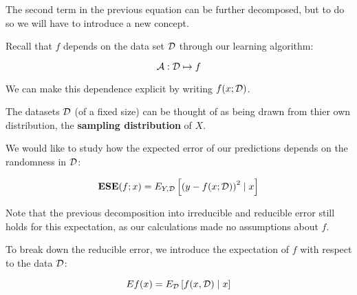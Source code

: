 %
%
\begin{frame}
  The second term in the previous equation can be further decomposed, but to do
  so we will have to introduce a new concept.  
\end{frame}
%
%
\begin{frame}
  Recall that $f$ depends on the data set $\operatorname*{\mathcal{D}}$ through our learning algorithm:

  $$ \operatorname*{\mathcal{A}} : \operatorname*{\mathcal{D}} \mapsto f $$

  We can make this dependence explicit by writing $f(x; \operatorname*{\mathcal{D}})$.
\end{frame}
%
%
\begin{frame}
  The datasets $\operatorname*{\mathcal{D}}$ (of a fixed size) can be thought of as being drawn from
  thier own distribution, the \textbf{sampling distribution} of $X$.   
\end{frame}
%
%
\begin{frame}
  We would like to study how the expected error of our predictions depends on
  the randomness in $\operatorname*{\mathcal{D}}$:

  $$ \operatorname*{\mathbf{ESE}}(f; x) = E_{Y,\operatorname*{\mathcal{D}}} \left[ \left( y - f(x; \operatorname*{\mathcal{D}}) \right)^2 \mid x \right]
  $$

  Note that the previous decomposition into irreducible and reducible error
  still holds for this expectation, as our calculations made no assumptions
  about $f$.
\end{frame}
%
%
\begin{frame}
  To break down the reducible error, we introduce the expectation of $f$ with
  respect to the data $\operatorname*{\mathcal{D}}$:

  $$ Ef(x) = E_{\operatorname*{\mathcal{D}}} \left[ f(x, \operatorname*{\mathcal{D}}) \mid x \right] $$
\end{frame}
%
%
